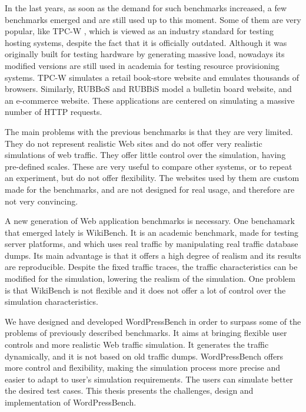 In the last years, as soon as the demand for such benchmarks increased, a few benchmarks emerged and are still used up to this moment. Some of them are very popular, like TPC-W \cite{TPCW-website}, which is viewed as an industry standard for testing hosting systems, despite the fact that it is officially outdated. Although it was originally built for testing hardware by generating massive load, nowadays its modified versions are still used in academia for testing resource provisioning systems.  TPC-W simulates a retail book-store website and emulates thousands of browsers. Similarly, RUBBoS \cite{RUBBoS-website} and RUBBiS \cite{RUBiS-website} model a bulletin board website, and an e-commerce website. These applications are centered on simulating a massive number of HTTP requests.

The main problems with the previous benchmarks is that they are very limited. They do not represent realistic Web sites and do not offer very realistic simulations of web traffic. They offer little control over the simulation, having pre-defined scales. These are very useful to compare other systems, or to repeat an experiment, but do not offer flexibility. The websites used by them are custom made for the benchmarks, and are not designed for real usage, and therefore are not very convincing.

A new generation of Web application benchmarks is necessary. One benchamark that emerged lately is WikiBench. It is an academic  benchmark, made for testing server platforms, and which uses real traffic by manipulating real traffic database dumps. Its main advantage is that it offers a high degree of realism and its results are reproducible. Despite the fixed traffic traces, the traffic characteristics can be modified for the simulation, lowering the realism of the simulation. One problem is that WikiBench is not flexible and it does not offer a lot of control over the simulation characteristics.

We have designed and developed WordPressBench in order to surpass some of the problems of previously described benchmarks. It aims at bringing flexible user controls and more realistic Web traffic simulation. It generates the traffic dynamically, and it is not based on old traffic dumps. WordPressBench offers more control and flexibility, making the simulation process more precise and easier to adapt to user's simulation requirements. The users can simulate better the desired test cases. This thesis presents the challenges, design and implementation of WordPressBench.

